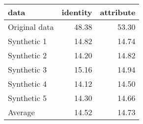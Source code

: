 \begin{tabular}{lrr}
  \toprule
data & identity & attribute \\ 
  \midrule
Original data & 48.38 & 53.30 \\ 
  Synthetic 1 & 14.82 & 14.74 \\ 
  Synthetic 2 & 14.20 & 14.82 \\ 
  Synthetic 3 & 15.16 & 14.94 \\ 
  Synthetic 4 & 14.12 & 14.50 \\ 
  Synthetic 5 & 14.30 & 14.66 \\ 
  Average & 14.52 & 14.73 \\ 
   \bottomrule
\end{tabular}
